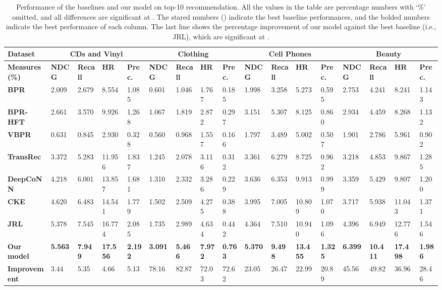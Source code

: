 \documentclass[algorithms,article,accept,moreauthors,pdftex,10pt,a4paper]{Definitions/mdpi}
\begin{document}
\begin{table}[H]
\caption{Performance of the baselines and our model on top-10 recommendation. 
		All the values in the table are percentage numbers with `\%' omitted, and all differences are significant at .
		The stared numbers () indicate the best baseline performances, and the bolded numbers indicate the best performance of each column. 
		The last line shows the percentage improvement of our model against the best baseline (i.e., JRL), which are significant at .}
	\hspace{-0.9cm}
	\setlength{\tabcolsep}{0pt}
	\begin{tabular}
{lllllllllllllllll} 
	\toprule
		\bf{Dataset} &  \multicolumn{4}{c}{\bf{CDs and Vinyl}} & \multicolumn{4}{c}{\bf{Clothing}} & \multicolumn{4}{c}{\bf{Cell Phones}} & \multicolumn{4}{c}{\bf{Beauty}}\\\hline
		\bf{Measures}(\%) & \bf{NDCG} &  \bf{Recall} &  \bf{HR} & \bf{Prec.} &\bf{ NDCG} & \bf{Recall} & \bf{HR} & \bf{Prec.} & \bf{NDCG} &\bf{ Recall} & \bf{HR} & \bf{Prec.} & \bf{NDCG} & \bf{Recall} & \bf{HR} & \bf{Prec.} \\\hline
		\bf{BPR}  & 2.009 & 2.679 & 8.554 & 1.085 & 0.601 & 1.046 & 1.767 & 0.185 & 1.998 & 3.258 & 5.273 & 0.595 & 2.753 & 4.241 & 8.241 & 1.143\\
		\bf{BPR-HFT} & 2.661 & 3.570 & 9.926 & 1.268 & 1.067 & 1.819 & 2.872 & 0.297 & 3.151 & 5.307 & 8.125 & 0.860 & 2.934  & 4.459 & 8.268 & 1.132\\
		\bf{VBPR} & 0.631 & 0.845 & 2.930 & 0.328 & 0.560 & 0.968 & 1.557 & 0.166 & 1.797 & 3.489 & 5.002 & 0.507 & 1.901 & 2.786 & 5.961 & 0.902\\
		\bf{TransRec} & 3.372 & 5.283 & 11.956 & 1.837 & 1.245 & 2.078 & 3.116 & 0.312 & 3.361 & 6.279 & 8.725 & 0.962 & 3.218  & 4.853 & 9.867 & 1.285\\
		\bf{DeepCoNN}  & 4.218 & 6.001 & 13.857 & 1.681 & 1.310 & 2.332 & 3.286 & 0.229 & 3.636 & 6.353 & 9.913 & 0.999 & 3.359 & 5.429 & 9.807 & 1.200\\
		\bf{CKE}  & 4.620 & 6.483 & 14.541 & 1.779 & 1.502 & 2.509 & 4.275 & 0.388 & 3.995 & 7.005 & 10.809 & 1.070 & 3.717 & 5.938 & 11.043 & 1.371\\
		\bf{JRL}& {5.378}  & {7.545}  & {16.774}  & {2.085}  & {1.735}  & {2.989}  & {4.634}  & {0.442}  & {4.364}  & {7.510}  & {10.940}  & {1.096}  & {4.396}  & {6.949}  & {12.776}  & {1.546} \\\hline
		\bf{Our model} & \textbf{5.563} & \textbf{7.949} & \textbf{17.556} & \textbf{2.192} & \textbf{3.091} & \textbf{5.466} & \textbf{7.972} & \textbf{0.763} & \textbf{5.370} & \textbf{9.498} & \textbf{13.455} & \textbf{1.325} & \textbf{6.399} & \textbf{10.411} & \textbf{17.498} & \textbf{1.986}\\\hline
		\bf{Improvement} & 3.44 & 5.35  & 4.66 & 5.13 & 78.16 & 82.87 & 72.03 & 72.62 & 23.05 & 26.47 & 22.99 & 20.89 & 45.56 & 49.82 & 36.96 & 28.46\\
	\bottomrule
	\end{tabular}\label{tab:result}
\end{table}
\end{document}
